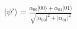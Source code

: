 \documentclass[preview]{standalone}
\begin{document}
\begin{align*}
|\psi'\rangle = \frac{\alpha_{00} |00\rangle + \alpha_{01}|01\rangle}{\sqrt{|\alpha_{00}|^2 + |\alpha_{01}|^2}}
\end{align*}
\end{document}
